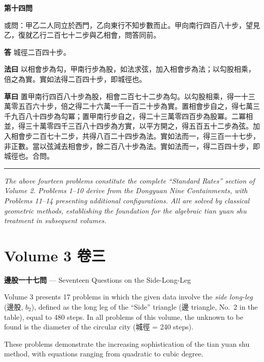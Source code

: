 \documentclass[11pt,a4paper]{article}
\newcommand{\problem}[1]{\par\noindent\textbf{\color{problemcolor}#1}\par\nopagebreak}
\newcommand{\answer}[1]{\par\noindent\textbf{答} #1\par}
\newcommand{\method}[1]{\par\noindent\textbf{法曰} #1\par}
\newcommand{\workings}[1]{\par\noindent\textbf{草曰} #1\par}
\begin{document}
\vspace{0.5cm}

\problem{第十四問}

\noindent 或問：甲乙二人同立於西門，乙向東行不知步數而止。甲向南行四百八十步，望見乙，復就乙行二百七十二步與乙相會，問答同前。

\answer{城徑二百四十步。}

\method{以相會步為勾，甲南行步為股，如法求弦，加入相會步為法；以勾股相乘，倍之為實。實如法得二百四十步，即城徑也。}

\workings{置甲南行四百八十步為股，相會二百七十二步為勾。以勾股相乘，得一十三萬零五百六十步，倍之得二十六萬一千一百二十步為實。置相會步自之，得七萬三千九百八十四步為勾冪；置甲南行步自之，得二十三萬零四百步為股冪。二冪相並，得三十萬零四千三百八十四步為方實，以平方開之，得五百五十二步為弦。加入相會步二百七十二步，共得八百二十四步為法。實如法而一，得三百一十七步，非正數。當以弦減去相會步，餘二百八十步為法。實如法而一，得二百四十步，即城徑也。合問。}

\vspace{0.5cm}

\noindent\textcolor{rulecolor}{\rule{\textwidth}{0.4pt}}

\textit{The above fourteen problems constitute the complete ``Standard Rates'' section of Volume 2. Problems 1--10 derive from the Dongyuan Nine Containments, with Problems 11--14 presenting additional configurations. All are solved by classical geometric methods, establishing the foundation for the algebraic tian yuan shu treatment in subsequent volumes.}

\newpage

\section{Volume 3 \quad 卷三}
\label{sec:vol3}

\textbf{邊股一十七問} --- Seventeen Questions on the Side-Long-Leg

Volume 3 presents 17 problems in which the given data involve the \textit{side long-leg} (邊股, $b_2$), defined as the long leg of the ``Side'' triangle (邊 triangle, No.\ 2 in the table), equal to 480 steps. In all problems of this volume, the unknown to be found is the diameter of the circular city (城徑 = 240 steps).

These problems demonstrate the increasing sophistication of the tian yuan shu method, with equations ranging from quadratic to cubic degree.
\end{document}
